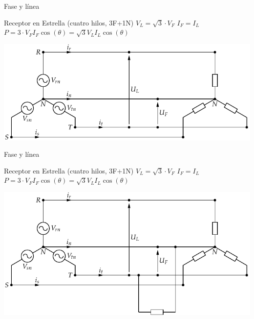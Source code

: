 \documentclass[xcolor={usenames,svgnames,dvipsnames}]{beamer}
\begin{document}
\begin{frame}[label={sec:orgeb7faef}]{Fase y línea}
\begin{block}{Receptor en Estrella (cuatro hilos, 3F+1N)}
\(V_{L}=\sqrt{3}\cdot V_{F}\) \(I_{F}=I_{L}\)
\(P=3\cdot V_{F}I_{F}\cos(\theta)=\sqrt{3}V_{L}I_{L}\cos(\theta)\)
\begin{center}
\includegraphics[width=.9\linewidth]{../figs/RedTrifasicaEstrella.pdf}
\end{center}
\end{block}
\end{frame}

\begin{frame}[label={sec:orgc221e49}]{Fase y línea}
\begin{block}{Receptor en Estrella (cuatro hilos, 3F+1N)}
\(V_{L}=\sqrt{3}\cdot V_{F}\) \(I_{F}=I_{L}\)
\(P=3\cdot V_{F}I_{F}\cos(\theta)=\sqrt{3}V_{L}I_{L}\cos(\theta)\)
\begin{center}
\includegraphics[width=.9\linewidth]{../figs/RedTrifasicaEstrella_CargaMonofasica.pdf}
\end{center}
\end{block}
\end{frame}
\end{document}
